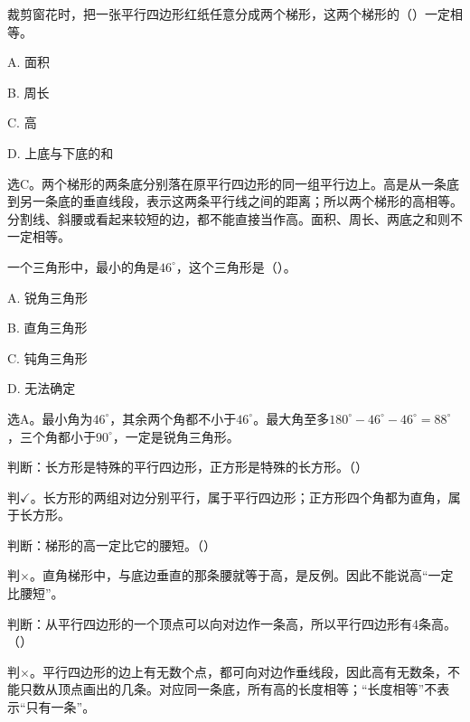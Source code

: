 裁剪窗花时，把一张平行四边形红纸任意分成两个梯形，这两个梯形的（\hspace{1.8em}）一定相等。\par
\noindent A. 面积\par
\noindent B. 周长\par
\noindent C. 高\par
\noindent D. 上底与下底的和\par
\begin{BookAnswer}
选C。两个梯形的两条底分别落在原平行四边形的同一组平行边上。高是从一条底到另一条底的垂直线段，表示这两条平行线之间的距离；所以两个梯形的高相等。分割线、斜腰或看起来较短的边，都不能直接当作高。面积、周长、两底之和则不一定相等。
\end{BookAnswer}

一个三角形中，最小的角是\(46^\circ\)，这个三角形是（\hspace{1.8em}）。\par
\noindent A. 锐角三角形\par
\noindent B. 直角三角形\par
\noindent C. 钝角三角形\par
\noindent D. 无法确定\par
\begin{BookAnswer}
选A。最小角为\(46^\circ\)，其余两个角都不小于\(46^\circ\)。最大角至多\(180^\circ-46^\circ-46^\circ=88^\circ\)，三个角都小于\(90^\circ\)，一定是锐角三角形。
\end{BookAnswer}

判断：长方形是特殊的平行四边形，正方形是特殊的长方形。（\hspace{1.8em}）\par
\begin{BookAnswer}
判\(\checkmark\)。长方形的两组对边分别平行，属于平行四边形；正方形四个角都为直角，属于长方形。
\end{BookAnswer}

判断：梯形的高一定比它的腰短。（\hspace{1.8em}）\par
\begin{BookAnswer}
判\(\times\)。直角梯形中，与底边垂直的那条腰就等于高，是反例。因此不能说高“一定比腰短”。
\end{BookAnswer}

判断：从平行四边形的一个顶点可以向对边作一条高，所以平行四边形有4条高。（\hspace{1.8em}）\par
\begin{BookAnswer}
判\(\times\)。平行四边形的边上有无数个点，都可向对边作垂线段，因此高有无数条，不能只数从顶点画出的几条。对应同一条底，所有高的长度相等；“长度相等”不表示“只有一条”。
\end{BookAnswer}

